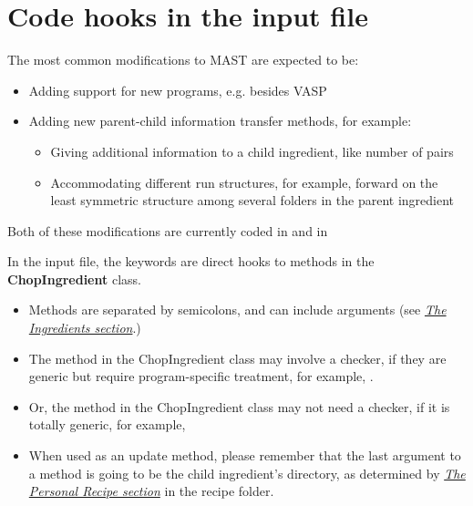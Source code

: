 \documentclass[letterpaper,10pt,english]{sphinxmanual}
\begin{document}
\section{Code hooks in the input file}
\label{12_0_programming:code-hooks-in-the-input-file}
The most common modifications to MAST are expected to be:
\begin{itemize}
\item {} 
Adding support for new programs, e.g. besides VASP

\item {} 
Adding new parent-child information transfer methods, for example:
\begin{itemize}
\item {} 
Giving additional information to a child ingredient, like number of pairs

\item {} 
Accommodating different run structures, for example, forward on the least symmetric structure among several folders in the parent ingredient

\end{itemize}

\end{itemize}

Both of these modifications are currently coded in  and in 

In the input file, the  keywords are direct hooks to methods in the \textbf{ChopIngredient} class.
\begin{itemize}
\item {} 
Methods are separated by semicolons, and can include arguments (see {\hyperref[3_1_2_ingredients::doc]{\emph{The Ingredients section}}}.)

\item {} 
The method in the ChopIngredient class may involve a checker, if they are generic but require program-specific treatment, for example, .

\item {} 
Or, the method in the ChopIngredient class may not need a checker, if it is totally generic, for example, 

\item {} 
When used as an update method, please remember that the last argument to a method is going to be the child ingredient's directory, as determined by {\hyperref[3_1_4_personalrecipe::doc]{\emph{The Personal Recipe section}}} in the recipe folder.

\end{itemize}
\end{document}
